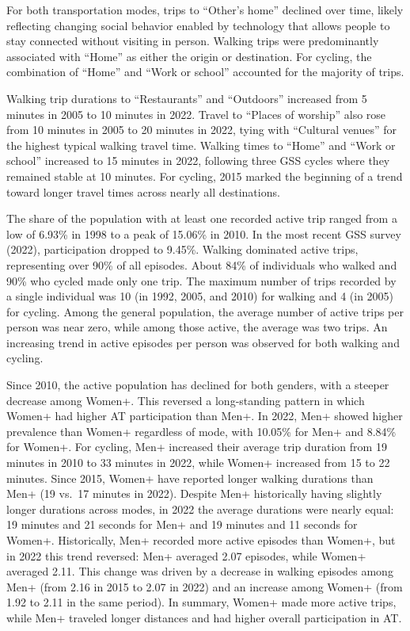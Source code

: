 \documentclass[preprint, 3p,
authoryear]{elsarticle} %
\begin{document}
For both transportation modes, trips to ``Other's home'' declined over
time, likely reflecting changing social behavior enabled by technology
that allows people to stay connected without visiting in person. Walking
trips were predominantly associated with ``Home'' as either the origin
or destination. For cycling, the combination of ``Home'' and ``Work or
school'' accounted for the majority of trips.

Walking trip durations to ``Restaurants'' and ``Outdoors'' increased
from 5 minutes in 2005 to 10 minutes in 2022. Travel to ``Places of
worship'' also rose from 10 minutes in 2005 to 20 minutes in 2022, tying
with ``Cultural venues'' for the highest typical walking travel time.
Walking times to ``Home'' and ``Work or school'' increased to 15 minutes
in 2022, following three GSS cycles where they remained stable at 10
minutes. For cycling, 2015 marked the beginning of a trend toward longer
travel times across nearly all destinations.

The share of the population with at least one recorded active trip
ranged from a low of 6.93\% in 1998 to a peak of 15.06\% in 2010. In the
most recent GSS survey (2022), participation dropped to 9.45\%. Walking
dominated active trips, representing over 90\% of all episodes. About
84\% of individuals who walked and 90\% who cycled made only one trip.
The maximum number of trips recorded by a single individual was 10 (in
1992, 2005, and 2010) for walking and 4 (in 2005) for cycling. Among the
general population, the average number of active trips per person was
near zero, while among those active, the average was two trips. An
increasing trend in active episodes per person was observed for both
walking and cycling.

Since 2010, the active population has declined for both genders, with a
steeper decrease among Women+. This reversed a long-standing pattern in
which Women+ had higher AT participation than Men+. In 2022, Men+ showed
higher prevalence than Women+ regardless of mode, with 10.05\% for Men+
and 8.84\% for Women+. For cycling, Men+ increased their average trip
duration from 19 minutes in 2010 to 33 minutes in 2022, while Women+
increased from 15 to 22 minutes. Since 2015, Women+ have reported longer
walking durations than Men+ (19 vs.~17 minutes in 2022). Despite Men+
historically having slightly longer durations across modes, in 2022 the
average durations were nearly equal: 19 minutes and 21 seconds for Men+
and 19 minutes and 11 seconds for Women+. Historically, Men+ recorded
more active episodes than Women+, but in 2022 this trend reversed: Men+
averaged 2.07 episodes, while Women+ averaged 2.11. This change was
driven by a decrease in walking episodes among Men+ (from 2.16 in 2015
to 2.07 in 2022) and an increase among Women+ (from 1.92 to 2.11 in the
same period). In summary, Women+ made more active trips, while Men+
traveled longer distances and had higher overall participation in AT.
\end{document}
